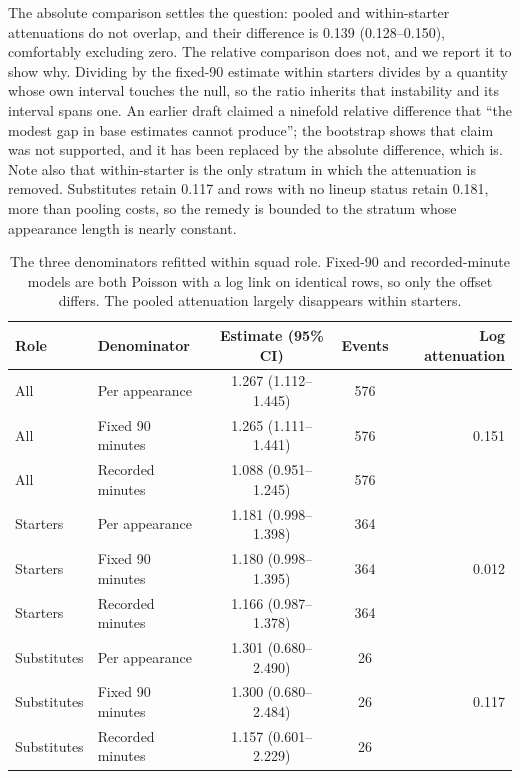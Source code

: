 \documentclass[11pt]{article}
\begin{document}
The absolute comparison settles the question: pooled and within-starter attenuations do not overlap, and their difference is 0.139 (0.128--0.150), comfortably excluding zero. The relative comparison does not, and we report it to show why. Dividing by the fixed-90 estimate within starters divides by a quantity whose own interval touches the null, so the ratio inherits that instability and its interval spans one. An earlier draft claimed a ninefold relative difference that ``the modest gap in base estimates cannot produce''; the bootstrap shows that claim was not supported, and it has been replaced by the absolute difference, which is. Note also that within-starter is the only stratum in which the attenuation is removed. Substitutes retain 0.117 and rows with no lineup status retain 0.181, more than pooling costs, so the remedy is bounded to the stratum whose appearance length is nearly constant.

\begin{table}[h]
\centering
\caption{The three denominators refitted within squad role. Fixed-90 and recorded-minute models are both Poisson with a log link on identical rows, so only the offset differs. The pooled attenuation largely disappears within starters.}
\label{tab:supp_denominator_role}
\small
\begin{tabular}{llccr}
\toprule
Role & Denominator & Estimate (95\% CI) & Events & Log attenuation\\
\midrule
All & Per appearance & 1.267 (1.112--1.445) & 576 & \multirow{3}{*}{0.151}\\
All & Fixed 90 minutes & 1.265 (1.111--1.441) & 576 & \\
All & Recorded minutes & 1.088 (0.951--1.245) & 576 & \\
\midrule
Starters & Per appearance & 1.181 (0.998--1.398) & 364 & \multirow{3}{*}{0.012}\\
Starters & Fixed 90 minutes & 1.180 (0.998--1.395) & 364 & \\
Starters & Recorded minutes & 1.166 (0.987--1.378) & 364 & \\
\midrule
Substitutes & Per appearance & 1.301 (0.680--2.490) & 26 & \multirow{3}{*}{0.117}\\
Substitutes & Fixed 90 minutes & 1.300 (0.680--2.484) & 26 & \\
Substitutes & Recorded minutes & 1.157 (0.601--2.229) & 26 & \\
\bottomrule
\end{tabular}
\end{table}
\end{document}

